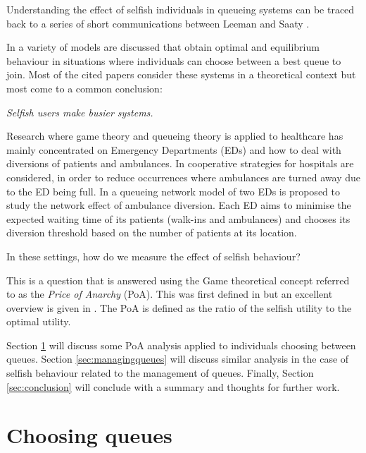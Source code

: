 \documentclass[a4paper,11pt]{article}
\begin{document}
Understanding the effect of selfish individuals in queueing systems can be traced back to a series of short communications between Leeman \cite{Leeman1964,Leeman1965} and Saaty \cite{Saaty1965}.

In \cite{Adler1969,Bell1983,Edelson1971,Knudsen1972,Luski1976,Naor1969,Yechiali1972} a variety of models are discussed that obtain optimal and equilibrium behaviour in situations where individuals can choose between a best queue to join.
Most of the cited papers consider these systems in a theoretical context but most come to a common conclusion:

\begin{center}
\textit{Selfish users make busier systems.}
\end{center}

Research where game theory and queueing theory is applied to healthcare has mainly concentrated on Emergency Departments (EDs) and how to deal with diversions of patients and ambulances.
In \cite{Hagtvedt2009} cooperative strategies for hospitals are considered, in order to reduce occurrences where ambulances are turned away due to the ED being full.
In \cite{Deo2011} a queueing network model of two EDs is proposed to study the network effect of ambulance diversion.
Each ED aims to minimise the expected waiting time of its patients (walk-ins and ambulances) and chooses its diversion threshold based on the number of patients at its location.

In these settings, how do we measure the effect of selfish behaviour?

This is a question that is answered using the Game theoretical concept referred to as the \textit{Price of Anarchy} (PoA).
This was first defined in \cite{Koutsoupias2009} but an excellent overview is given in \cite{Roughgarden2005}.
The PoA is defined as the ratio of the selfish utility to the optimal utility.

Section \ref{sec:choosingqueues} will discuss some PoA analysis applied to individuals choosing between queues.
Section \ref{sec:managingqueues} will discuss similar analysis in the case of selfish behaviour related to the management of queues.
Finally, Section \ref{sec:conclusion} will conclude with a summary and thoughts for further work.

\section{Choosing queues}\label{sec:choosingqueues}
\end{document}
